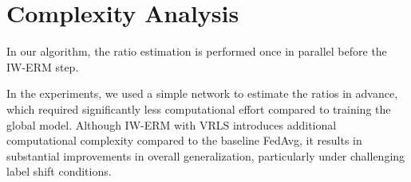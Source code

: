 \section{Complexity Analysis}\label{app:complex}

In our algorithm, the ratio estimation is performed once in parallel before the IW-ERM step.

In the experiments, we used a simple network to estimate the ratios in advance, which required significantly less computational effort compared to training the global model. Although IW-ERM with VRLS introduces additional computational complexity compared to the baseline FedAvg, it results in substantial improvements in overall generalization, particularly under challenging label shift conditions.
